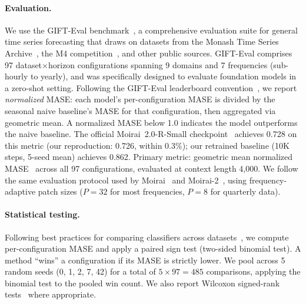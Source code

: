 \documentclass[11pt]{article}
\begin{document}
\paragraph{Evaluation.} We use the GIFT-Eval benchmark~\citep{vijay2024gifteval}, a comprehensive evaluation suite for general time series forecasting that draws on datasets from the Monash Time Series Archive~\citep{godahewa2021monash}, the M4 competition~\citep{makridakis2020m4}, and other public sources. GIFT-Eval comprises 97 dataset$\times$horizon configurations spanning 9 domains and 7 frequencies (sub-hourly to yearly), and was specifically designed to evaluate foundation models in a zero-shot setting. Following the GIFT-Eval leaderboard convention~\citep{vijay2024gifteval}, we report \emph{normalized} MASE: each model's per-configuration MASE is divided by the seasonal naive baseline's MASE for that configuration, then aggregated via geometric mean. A normalized MASE below 1.0 indicates the model outperforms the naive baseline. The official Moirai~2.0-R-Small checkpoint~\citep{liu2024moirai2} achieves 0.728 on this metric (our reproduction: 0.726, within 0.3\%); our retrained baseline (10K steps, 5-seed mean) achieves 0.862. Primary metric: geometric mean normalized MASE~\citep{hyndman2006another} across all 97 configurations, evaluated at context length 4,000. We follow the same evaluation protocol used by Moirai~\citep{woo2024unified} and Moirai-2~\citep{liu2024moirai2}, using frequency-adaptive patch sizes ($P=32$ for most frequencies, $P=8$ for quarterly data).

\paragraph{Statistical testing.} Following best practices for comparing classifiers across datasets~\citep{demsar2006statistical}, we compute per-configuration MASE and apply a paired sign test (two-sided binomial test). A method ``wins'' a configuration if its MASE is strictly lower. We pool across 5 random seeds (0, 1, 2, 7, 42) for a total of $5 \times 97 = 485$ comparisons, applying the binomial test to the pooled win count. We also report Wilcoxon signed-rank tests~\citep{wilcoxon1945individual} where appropriate.
\end{document}
